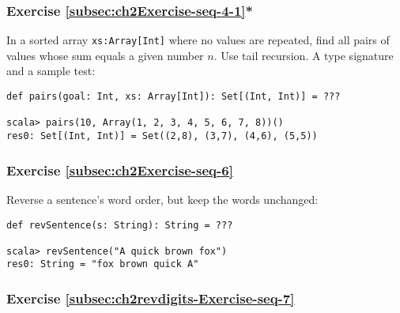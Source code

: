 \subsubsection{Exercise \label{subsec:ch2Exercise-seq-4-1}\ref{subsec:ch2Exercise-seq-4-1}{*}}

In a sorted array \lstinline!xs:Array[Int]! where no values are repeated,
find all pairs of values whose sum equals a given number $n$. Use
tail recursion. A type signature and a sample test:
\begin{lstlisting}
def pairs(goal: Int, xs: Array[Int]): Set[(Int, Int)] = ???

scala> pairs(10, Array(1, 2, 3, 4, 5, 6, 7, 8))()
res0: Set[(Int, Int)] = Set((2,8), (3,7), (4,6), (5,5))
\end{lstlisting}
\begin{comment}
Solution:
\begin{lstlisting}
@tailrec def pairs(goal: Int, xs: Array[Int])(res: Set[(Int, Int)] = Set(), left: Int = 0, right: Int = xs.length): Set[(Int, Int)] = if (left == right) res else {
  val sum = xs(left) + xs(right - 1)
  val (newLeft, newRight, newRes) = if (sum == goal) (left + 1, right, res + ((xs(left), xs(right - 1)))) else if (sum < goal) (left + 1, right, res) else (left, right - 1, res)
  pairs(goal, xs)(newRes, newLeft, newRight)
}
\end{lstlisting}
\end{comment}


\subsubsection{Exercise \label{subsec:ch2Exercise-seq-6}\ref{subsec:ch2Exercise-seq-6}}

Reverse a sentence's word order, but keep the words unchanged:
\begin{lstlisting}
def revSentence(s: String): String = ???

scala> revSentence("A quick brown fox")
res0: String = "fox brown quick A"
\end{lstlisting}


\subsubsection{Exercise \label{subsec:ch2revdigits-Exercise-seq-7}\ref{subsec:ch2revdigits-Exercise-seq-7}}


